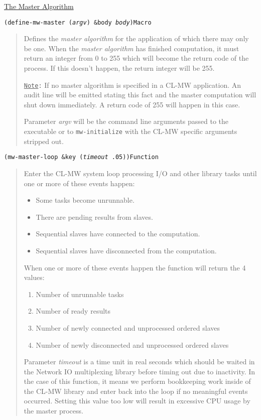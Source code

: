 \documentclass[titlepage,12pt]{book}
\newcommand{\phlabel}[1]{\phantomsection\label{#1}}
\newcommand{\xsmall}{\latexhtml{\small}{}}
\newcommand{\xnormalsize}{\latexhtml{\normalsize}{}}
\newcommand{\clmw}{\xsmall\textsc{CL-MW}\xnormalsize\xspace}
\newcommand{\ma}{\textit{master algorithm}\xspace}
\newcommand{\func}[1]{\mbox{\texttt{#1}}\xspace}
\newcommand{\Note}{\texttt{\underline{Note}:}\xspace}
\newcommand{\apiheader}[1]{\begin{center}\underline{#1}\end{center}}
\newcommand{\apifunc}[2]{\noindent\xsmall\texttt{(#1)}\hspace*{\fill}\xnormalsize\texttt{#2}}
\newenvironment{apientry}[2]
	{\apifunc{#1}{#2}\begin{quotation}}
	{\end{quotation}}
\begin{document}
\apiheader{\phlabel{master-algorithm-api}The Master Algorithm}
\begin{apientry}
{define-mw-master (\emph{argv}) \&body \emph{body}}
{Macro}
Defines the \ma for the application of which there may only be one.
When the \ma has finished computation, it must return an integer from 0 to 255
which will become the return code of the process. If this doesn't happen,
the return integer will be 255.

\Note If no master algorithm is specified in a \clmw application. An
audit line will be emitted stating this fact and the master computation
will shut down immediately. A return code of 255 will happen in
this case.

Parameter \emph{argv} will be the command line arguments passed to
the executable or to \func{mw-initialize} with the \clmw specific
arguments stripped out.
\end{apientry}

\begin{apientry}
{mw-master-loop \&key (\emph{timeout} .05)}
{Function}
Enter the \clmw system loop processing I/O and other library tasks until
one or more of these events happen:
\begin{itemize}
\item Some tasks become unrunnable.
\item There are pending results from slaves.
\item Sequential slaves have connected to the computation.
\item Sequential slaves have disconnected from the computation.
\end{itemize}

When one or more of these events happen the function will return the
4 values: 

\begin{enumerate}
\item Number of unrunnable tasks
\item Number of ready results
\item Number of newly connected and unprocessed ordered slaves
\item Number of newly disconnected and unprocessed ordered slaves
\end{enumerate}

Parameter \emph{timeout} is a time unit in real seconds which should
be waited in the Network IO multiplexing library before timing out
due to inactivity.  In the case of this function, it means we perform
bookkeeping work inside of the \clmw library and enter back into the
loop if no meaningful events occurred. Setting this value too low will
result in excessive CPU usage by the master process.

\end{apientry}
\end{document}

